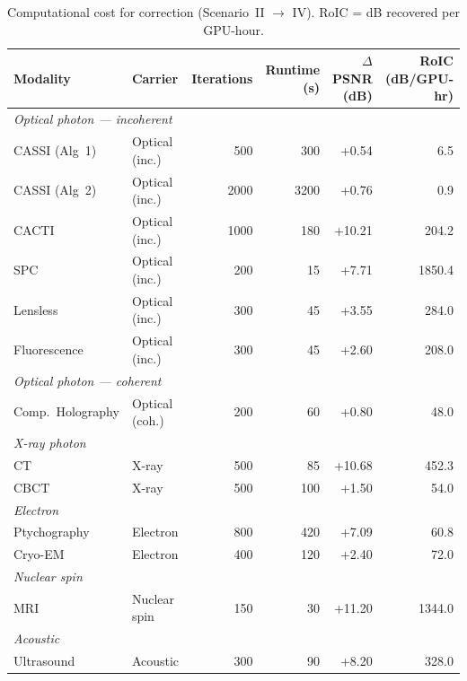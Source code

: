 \documentclass[11pt]{article}
\theoremstyle{definition}
\begin{document}
\begin{table}[htbp]
\centering
\caption{Computational cost for correction (Scenario~II $\to$ IV).
RoIC = dB recovered per GPU-hour.}
\label{tab:cost}
\begin{tabular}{l l r r r r}
\toprule
\textbf{Modality} & \textbf{Carrier} & \textbf{Iterations} & \textbf{Runtime (s)} &
  \textbf{$\Delta$PSNR (dB)} & \textbf{RoIC (dB/GPU-hr)} \\
\midrule
\multicolumn{6}{l}{\textit{Optical photon — incoherent}} \\
CASSI (Alg~1)    & Optical (inc.)  &   500 &    300 &  +0.54 &    6.5 \\
CASSI (Alg~2)    & Optical (inc.)  &  2000 &   3200 &  +0.76 &    0.9 \\
CACTI            & Optical (inc.)  &  1000 &    180 & +10.21 &  204.2 \\
SPC              & Optical (inc.)  &   200 &     15 &  +7.71 & 1850.4 \\
Lensless         & Optical (inc.)  &   300 &     45 &  +3.55 &  284.0 \\
Fluorescence     & Optical (inc.)  &   300 &     45 &  +2.60 &  208.0 \\
\multicolumn{6}{l}{\textit{Optical photon — coherent}} \\
Comp.\ Holography & Optical (coh.) &   200 &     60 &  +0.80 &   48.0 \\
\multicolumn{6}{l}{\textit{X-ray photon}} \\
CT               & X-ray           &   500 &     85 & +10.68 &  452.3 \\
CBCT             & X-ray           &   500 &    100 &  +1.50 &   54.0 \\
\multicolumn{6}{l}{\textit{Electron}} \\
Ptychography     & Electron        &   800 &    420 &  +7.09 &   60.8 \\
Cryo-EM          & Electron        &   400 &    120 &  +2.40 &   72.0 \\
\multicolumn{6}{l}{\textit{Nuclear spin}} \\
MRI              & Nuclear spin    &   150 &     30 & +11.20 & 1344.0 \\
\multicolumn{6}{l}{\textit{Acoustic}} \\
Ultrasound       & Acoustic        &   300 &     90 &  +8.20 &  328.0 \\
\bottomrule
\end{tabular}
\end{table}
\end{document}
